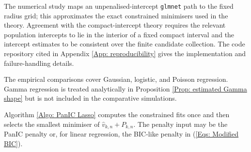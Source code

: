 \documentclass[12pt]{article}
\newenvironment{bluechange}{\begingroup\color[rgb]{0.00,0.00,1.00}}{\endgroup}
\theoremstyle{remark}
\theoremstyle{plain}
\begin{document}
\begin{bluechange}
The numerical study maps an unpenalised-intercept \texttt{glmnet} path to the fixed radius grid; this approximates the exact constrained minimisers used in the theory. Agreement with the compact-intercept theory requires the relevant population intercepts to lie in the interior of a fixed compact interval and the intercept estimates to be consistent over the finite candidate collection. The code repository cited in Appendix \ref{App: reproducibility} gives the implementation and failure-handling details.

The empirical comparisons cover Gaussian, logistic, and Poisson regression. Gamma regression is treated analytically in Proposition \ref{Prop: estimated Gamma shape} but is not included in the comparative simulations.
\end{bluechange}

Algorithm \ref{Algo: PanIC Lasso} computes the constrained fits once and then selects the smallest minimiser of $\widehat v_{k,n}+P_{k,n}$. The penalty input may be the PanIC penalty or, for linear regression, the BIC-like penalty in (\ref{Eqs: Modified BIC}).
\end{document}

